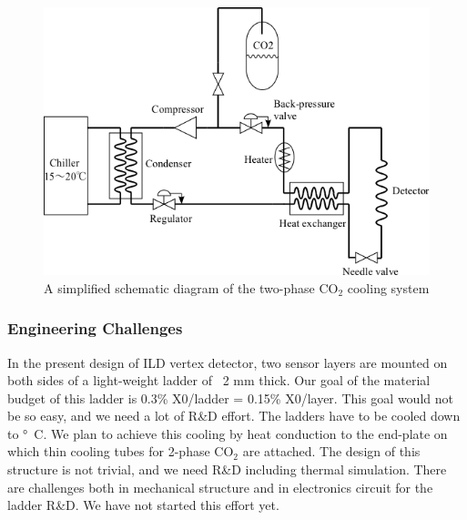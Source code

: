 \begin{figure}
    \includegraphics[width=\textwidth]{VertexDetector/FPCCD/coolingSystemSchematic.png}
    \caption{A simplified schematic diagram of the two-phase $\text{CO}_2$ cooling system}
    \label{fig:FPCCD:coolingSystemSchematic}
\end{figure}

\subsubsection{Engineering Challenges}
    In the present design of ILD vertex detector, two sensor layers are mounted on both sides of a light-weight ladder of ~2 mm thick. Our goal of the material budget of this ladder is 0.3\% X0/ladder = 0.15\% X0/layer. This goal would not be so easy, and we need a lot of R\&D effort.
    The ladders have to be cooled down to \unit[-40]{\degree C}. We plan to achieve this cooling by heat conduction to the end-plate on which thin cooling tubes for 2-phase $\text{CO}_2$ are attached. The design of this structure is not trivial, and we need R\&D including thermal simulation.
    There are challenges both in mechanical structure and in electronics circuit for the ladder R\&D. We have not started this effort yet.
